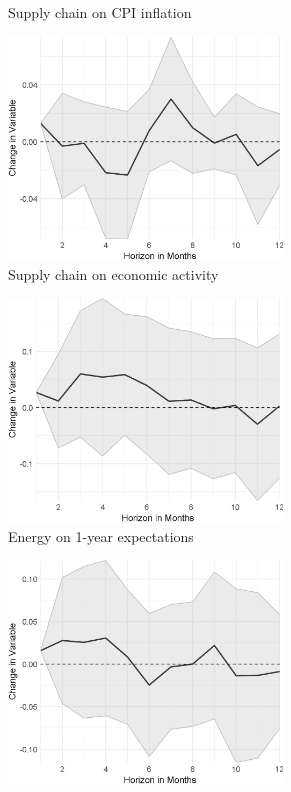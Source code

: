 \begin{figure}
\begin{subfigure}{00.24\textwidth}
		\caption{Supply chain on CPI inflation}
	\end{subfigure}
	\begin{subfigure}{00.24\textwidth}
		\includegraphics[width=0.8\textwidth]{output/lp/baseline/bHP/supply_chain/supply_chainoneconac_djn.eps}
		\caption{Supply chain on economic activity}
	\end{subfigure}
	\begin{subfigure}{00.24\textwidth}
		\includegraphics[width=0.8\textwidth]{output/lp/baseline/bHP/energy/energyonexpectations1y_djn.eps}
		\caption{Energy on 1-year expectations}
	\end{subfigure}
	\begin{subfigure}{00.24\textwidth}
		\includegraphics[width=0.8\textwidth]{output/lp/baseline/bHP/energy/energyonexpectations3y_djn.eps}

\end{subfigure}
\end{figure}
